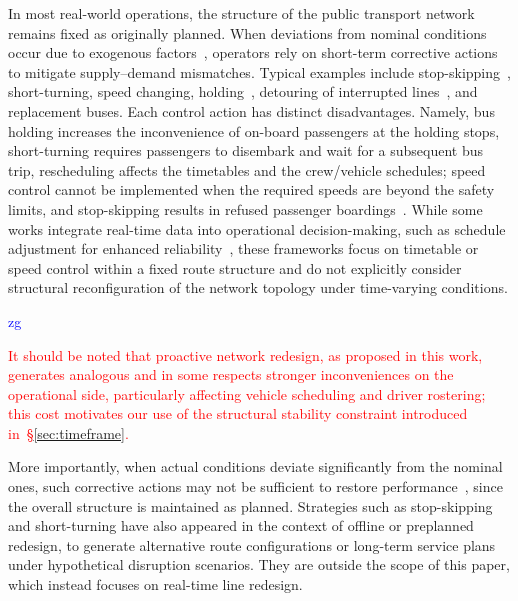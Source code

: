 \documentclass[a4paper,fleqn]{cas-sc}
\newcommand{\stkout}[1]{\ifmmode\text{\sout{\ensuremath{#1}}}\else\sout{#1}\fi}
\newcommand\rev[3]{\textcolor{blue}{\begin{scriptsize}{#1}\end{scriptsize}\stkout{#2}}\textcolor{red}{#3}}
\newcommand\rev[3]{\ignorespaces#3\ignorespaces\unskip}
\begin{document}
In most real-world operations, the structure of the public transport network remains fixed as originally planned. 
When deviations from nominal conditions occur due to exogenous factors~\citep{nissen2020does, chen2009analyzing}, 
operators rely on short-term corrective actions to mitigate supply--demand mismatches.
Typical examples include stop-skipping~\citep{peled2021quality}, short-turning, 
speed changing, holding~\citep{tang2018optimal, manasra2019optimization, gkiotsalitis2020public, olvera2023holding}, 
detouring of interrupted lines~\citep{zheng2023multi}, and replacement buses.
Each control action has distinct disadvantages.
Namely, bus holding increases the inconvenience of on-board passengers at the holding stops, short-turning requires passengers to disembark and wait for a subsequent bus trip, rescheduling affects the timetables and the crew/vehicle schedules; speed control cannot be implemented when the required speeds are beyond the safety limits, and stop-skipping results in refused passenger boardings~\citep{gkiotsalitis2021stop}.
While some works integrate real-time data into operational decision-making, such as schedule adjustment for enhanced reliability~\citep{cao2019real}, these frameworks focus on timetable or speed control within a fixed route structure and do not explicitly consider structural reconfiguration of the network topology under time-varying conditions.
\rev{zg}{}{It should be noted that proactive network redesign, as proposed in this work, generates analogous and in some respects stronger inconveniences on the operational side, particularly affecting vehicle scheduling and driver rostering; this cost motivates our use of the structural stability constraint introduced in~\S{}\ref{sec:timeframe}.}

More importantly, when actual conditions deviate significantly from the nominal ones, such corrective actions may not be sufficient to restore performance~\citep{guo2024restoring}, since the overall structure is maintained as planned.
%
Strategies such as stop-skipping and short-turning have also appeared in the context of offline or preplanned redesign, to generate alternative route configurations or long-term service plans under hypothetical disruption scenarios. They are outside the scope of this paper, which instead focuses on real-time line redesign.
\end{document}
